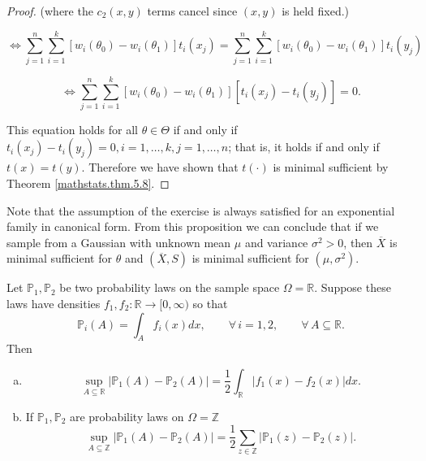 \begin{proof}
(where the \(c_2(x,y)\) terms cancel since \((x,y)\) is held fixed.)



\[
\iff \sum_{j=1}^n \sum_{i=1}^{k}[w_{i}(\theta_0)  - w_{i}(\theta_1)] t_{i}(x_j)  = \sum_{j=1}^n \sum_{i=1}^{k}[w_{i}(\theta_0)- w_{i}(\theta_1)] t_{i}(y_j)
\]

\[
\iff \sum_{j=1}^n \sum_{i=1}^{k}[w_{i}(\theta_0)  - w_{i}(\theta_1)] [t_{i}(x_j) -  t_{i}(y_j)] = 0.
\]



This equation holds for all \(\theta \in \Theta\) if and only if \(t_{i}(x_j) -  t_{i}(y_j) = 0, i = 1, \ldots, k, j = 1, \ldots, n\); that is, it holds if and only if \(t(x) = t(y)\). Therefore we have shown that \(t(\cdot)\) is minimal sufficient by Theorem \ref{mathstats.thm.5.8}.

\end{proof}





\begin{remark} Note that the assumption of the exercise is always satisfied for an exponential family in canonical form. From this proposition we can conclude that if we sample from a Gaussian with unknown mean $\mu$ and variance $\sigma^{2}>0$, 
then $\overline{X}$ is minimal sufficient for $\theta$ and $(\overline{X},S)$ is minimal sufficient for $(\mu,\sigma^{2})$.
\end{remark}

\begin{proposition}

Let $\mathbb{P}_{1},\mathbb{P}_{2}$ be two probability laws on the sample space $\Omega=\mathbb{R}$.  Suppose these laws have densities $f_{1},f_{2}:\mathbb{R}\to[0,\infty)$ so that
$$\mathbb{P}_{i}(A)=\int_{A}f_{i}(x)dx,\qquad\forall\,i=1,2,\qquad\forall\,A\subseteq\mathbb{R}.$$ Then

\begin{enumerate}[(a)]

\item
$$\sup_{A\subseteq\mathbb{R}}|\mathbb{P}_{1}(A)-\mathbb{P}_{2}(A)|=\frac{1}{2}\int_{\mathbb{R}}|f_{1}(x)-f_{2}(x)|dx.$$

\item If $\mathbb{P}_{1},\mathbb{P}_{2}$ are probability laws on $\Omega=\mathbb{Z}$
$$\sup_{A\subseteq\mathbb{Z}}|\mathbb{P}_{1}(A)-\mathbb{P}_{2}(A)|=\frac{1}{2}\sum_{z\in\mathbb{Z}}|\mathbb{P}_{1}(z)-\mathbb{P}_{2}(z)|.$$

\end{enumerate}

\end{proposition}

